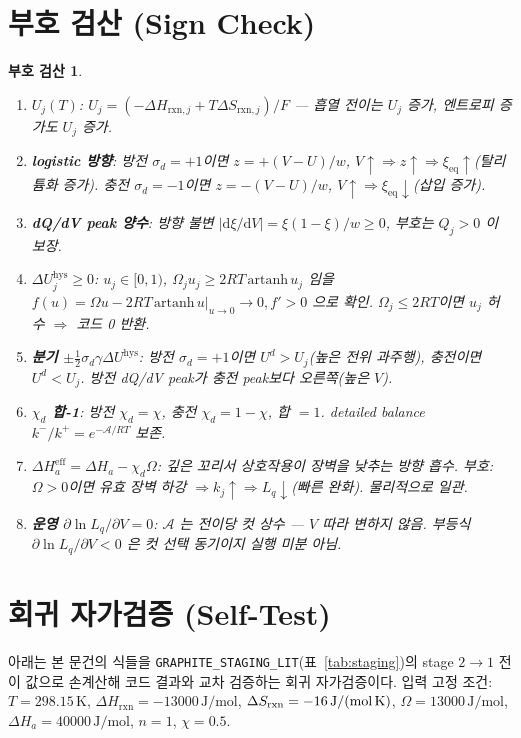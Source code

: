 \documentclass[11pt,a4paper]{article}
\newtheorem*{signbox}{부호 검산}
\newcommand{\dd}{\mathrm{d}}
\newcommand{\eff}{\mathrm{eff}}
\newcommand{\eq}{\mathrm{eq}}
\newcommand{\rxn}{\mathrm{rxn}}
\newcommand{\hys}{\mathrm{hys}}
\newcommand{\code}[1]{\texttt{#1}}
\begin{document}
\section*{부호 검산 (Sign Check)}\label{sec:signcheck}
\begin{signbox}
\begin{enumerate}[label=\textbf{S\arabic*.},leftmargin=*,itemsep=2pt]
\item \textbf{$U_j(T)$}: $U_j=(- \Delta H_{\rxn,j}+T\Delta S_{\rxn,j})/F$ — 흡열 전이는 $U_j$ 증가, 엔트로피 증가도 $U_j$ 증가. \checkmark
\item \textbf{logistic 방향}: 방전 $\sigma_d=+1$이면 $z=+(V-U)/w$, $V\!\uparrow\Rightarrow z\!\uparrow\Rightarrow\xi_\eq\!\uparrow$(탈리튬화 증가). 충전 $\sigma_d=-1$이면 $z=-(V-U)/w$, $V\!\uparrow\Rightarrow\xi_\eq\!\downarrow$(삽입 증가). \checkmark
\item \textbf{dQ/dV peak 양수}: 방향 불변 $|\dd\xi/\dd V|=\xi(1-\xi)/w\ge0$, 부호는 $Q_j>0$ 이 보장. \checkmark
\item \textbf{$\Delta U_j^\hys\ge0$}: $u_j\in[0,1)$, $\Omega_j u_j\ge2RT\,\mathrm{artanh}\,u_j$ 임을 $f(u)=\Omega u-2RT\,\mathrm{artanh}\,u|_{u\to0}\to0, f'>0$ 으로 확인. $\Omega_j\le2RT$이면 $u_j$ 허수 $\Rightarrow$ 코드 0 반환. \checkmark
\item \textbf{분기 $\pm\frac12\sigma_d\gamma\Delta U^\hys$}: 방전 $\sigma_d=+1$이면 $U^d>U_j$(높은 전위 과주행), 충전이면 $U^d<U_j$. 방전 dQ/dV peak가 충전 peak보다 오른쪽(높은 $V$). \checkmark
\item \textbf{$\chi_d$ 합-1}: 방전 $\chi_d=\chi$, 충전 $\chi_d=1-\chi$, 합 $=1$. detailed balance $k^-/k^+=e^{-\mathcal A/RT}$ 보존. \checkmark
\item \textbf{$\Delta H_a^\eff=\Delta H_a-\chi_d\Omega$}: 깊은 꼬리서 상호작용이 장벽을 낮추는 방향 흡수. 부호: $\Omega>0$이면 유효 장벽 하강 $\Rightarrow k_j\uparrow\Rightarrow L_q\downarrow$(빠른 완화). 물리적으로 일관. \checkmark
\item \textbf{운영 $\partial\ln L_q/\partial V=0$}: $\mathcal A$ 는 전이당 컷 상수 — $V$ 따라 변하지 않음. 부등식 $\partial\ln L_q/\partial V<0$ 은 컷 선택 동기이지 실행 미분 아님. \checkmark
\end{enumerate}
\end{signbox}

\section*{회귀 자가검증 (Self-Test)}\label{sec:selftest}
아래는 본 문건의 식들을 \code{GRAPHITE\_STAGING\_LIT}(표~\ref{tab:staging})의 stage $2\!\to\!1$ 전이 값으로
손계산해 코드 결과와 교차 검증하는 회귀 자가검증이다. 입력 고정 조건: $T=298.15\,\text{K}$,
$\Delta H_\rxn=-13000\,\text{J/mol}$, $\Delta S_\rxn=-16\,\text{J/(mol\,K)}$,
$\Omega=13000\,\text{J/mol}$, $\Delta H_a=40000\,\text{J/mol}$, $n=1$, $\chi=0.5$.
\end{document}
